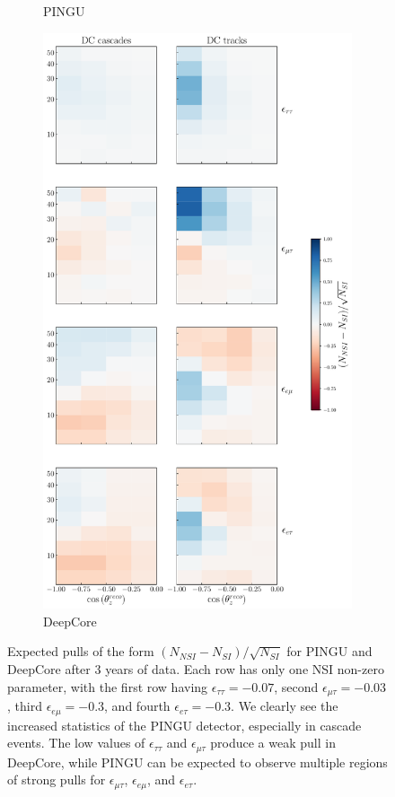\documentclass{revtex4-2}
\newcommand{\emt}{\ensuremath{\epsilon_{\mu\tau}}}
\newcommand{\eet}{\epsilon_{e\tau}}
\newcommand{\eem}{\epsilon_{e\mu}}
\newcommand{\ett}{\ensuremath{\epsilon_{\tau\tau}}}
\begin{document}
{{\begin{figure}[t]
\begin{center}
\begin{subfigure}{0.44\textwidth}
          \caption{PINGU}\label{fig:PINGU_event_pulls}
       \end{subfigure}
       \begin{subfigure}{0.54\textwidth}
          \includegraphics[width=1\linewidth]{figures/DC_event_pulls.pdf}
          \caption{DeepCore}\label{fig:DC_event_pulls}
       \end{subfigure}
     \end{center}
    \caption{Expected pulls of the form $(N_{NSI} - N_{SI})/\sqrt{N_{SI}}$ for PINGU and DeepCore after 3 years of data. 
    Each row has only one NSI non-zero parameter, with the first row having $\ett= -0.07$, second $\emt = -0.03$, third $\eem = -0.3$, and fourth $\eet = -0.3$.
    We clearly see the increased statistics of the PINGU detector, especially in cascade events. The low values of $\ett$ and $\emt$ produce a weak pull in DeepCore,
    while PINGU can be expected to observe multiple regions of strong pulls for $\emt$, $\eem$, and $\eet$.}\label{fig:event_pulls}
 \end{figure}
 
}}
\end{document}
